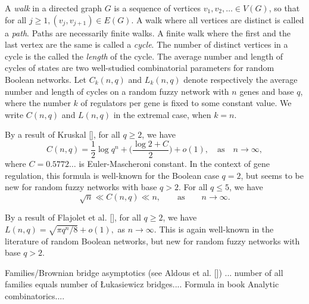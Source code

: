 \documentclass[letterpaper]{article}
\begin{document}
 A \emph{walk} in a directed graph $G$ is a sequence of vertices  $v_1,v_2,\dots\in V(G)$, so that for all $j\geq 1, (v_j,v_{j+1})\in E(G)$.
A walk where all vertices are distinct is called a \emph{path}.
Paths are necessarily finite walks.   
A finite walk where the first and the last vertex are the same is called a \emph{cycle}. 
The number of distinct vertices in a cycle is the called the \emph{length} of the cycle. 
The average number and length of cycles of states are two well-studied combinatorial parameters for  random Boolean networks. 
 Let $C_k(n,q)$ and $L_k(n,q)$ denote respectively  the average number and length of cycles  
 on a random fuzzy network with $n$ genes and base $q$, where the number $k$ of regulators per gene is fixed to some constant value. 
 We write $C(n,q)$ and $L(n,q)$ in the extremal case, when $k=n$.
 
 By a result of Kruskal [], for all $q\geq 2$, we have
\[
C(n,q)=\frac{1}{2}\log q^n + \bigg( \frac{\log 2 + C}{2} \bigg) + o(1),\quad\text{as}\quad n\to\infty,
\]
 where $C=0.5772\dots$ is Euler-Mascheroni constant. 
In the context of  gene regulation, this  formula  is well-known for the Boolean case $q=2$, but seems to be new for random fuzzy networks with base $q>2$. 
For all $q\leq 5$, we have
 \[
 \sqrt{n}\ll C(n,q) \ll n,\qquad\text{as}\qquad n\to\infty.
 \]
 
By a result of Flajolet et al. [], for all $q\geq 2$, we have $
L(n,q)=\sqrt{\pi q^n/8}+o(1),
$
  as $n\to \infty$.
  This is again well-known in the literature of random Boolean networks, but new for random fuzzy networks with base $q>2$.
  
  \[\]\[\]
 Families/Brownian bridge asymptotics (see Aldous et al.  []) ...
 number of all families equals number of \L ukasiewicz bridges.... Formula in book Analytic combinatorics....


% 
\newpage
 
\section{}




\footnotesize
%
\end{document}
